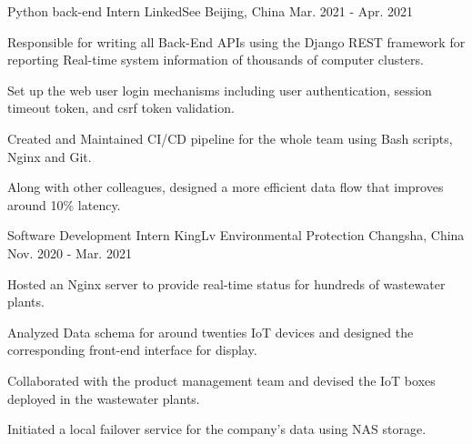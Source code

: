


\begin{cventries}
  \cventry
    {Python back-end Intern}
    {LinkedSee}
    {Beijing, China}
    {Mar. 2021 - Apr. 2021}
    {
      \begin{cvitems} %
        \item {Responsible for writing all Back-End APIs using the Django REST framework for reporting Real-time system information of thousands of computer clusters.}
        \item {Set up the web user login mechanisms including user authentication, session timeout token, and csrf token validation. }
        \item {Created and Maintained CI/CD pipeline for the whole team using Bash scripts, Nginx and Git.}
        \item {Along with other colleagues, designed a more efficient data flow that improves around 10\% latency.}
      \end{cvitems}
    }
\end{cventries}

\begin{cventries}
  \cventry
    {Software Development Intern}
    {KingLv Environmental Protection}
    {Changsha, China}
    {Nov. 2020 - Mar. 2021}
    {
      \begin{cvitems} %
        \item {Hosted an Nginx server to provide real-time status for hundreds of wastewater plants. }
        \item {Analyzed Data schema for around twenties IoT devices and designed the corresponding front-end interface for display.}
        \item {Collaborated with the product management team and devised the IoT boxes deployed in the wastewater plants.}
        \item {Initiated a local failover service for the company's data using NAS storage. }
      \end{cvitems}
    }
\end{cventries}